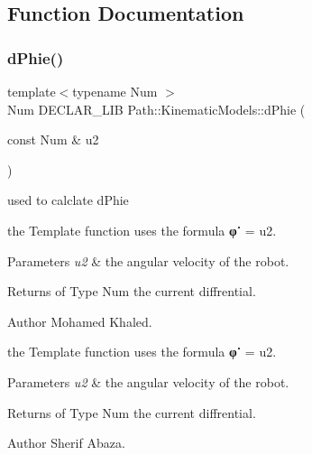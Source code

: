 \subsection{Function Documentation}
\mbox{\label{namespace_path_1_1_kinematic_models_a9056e401aa320699847d4ab3b3e73a98}} 
\subsubsection{\texorpdfstring{d\+Phie()}{dPhie()}\hspace{0.1cm}{\footnotesize\ttfamily [1/2]}}
{\footnotesize\ttfamily template$<$typename Num $>$ \\
Num D\+E\+C\+L\+A\+R\+\_\+\+L\+IB Path\+::\+Kinematic\+Models\+::d\+Phie (\begin{DoxyParamCaption}\item[{const Num \&}]{u2 }\end{DoxyParamCaption})}



used to calclate d\+Phie 

the Template function uses the formula {\bfseries φ˙} = u2. 
\begin{DoxyParams}{Parameters}
{\em u2} & the angular velocity of the robot. \\
\hline
\end{DoxyParams}
\begin{DoxyReturn}{Returns}
of Type Num the current diffrential. 
\end{DoxyReturn}
\begin{DoxyAuthor}{Author}
Mohamed Khaled.
\end{DoxyAuthor}
the Template function uses the formula {\bfseries φ˙} = u2. 
\begin{DoxyParams}{Parameters}
{\em u2} & the angular velocity of the robot. \\
\hline
\end{DoxyParams}
\begin{DoxyReturn}{Returns}
of Type Num the current diffrential. 
\end{DoxyReturn}
\begin{DoxyAuthor}{Author}
Sherif Abaza. 
\end{DoxyAuthor}
\mbox{\label{namespace_path_1_1_kinematic_models_a3433ae2dd28c9f7b8b66c42c173ce543}} 

